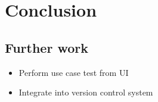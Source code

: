 \chapter{Conclusion}

\section{Further work}
\begin{itemize}
  \item Perform use case test from UI
  \item Integrate into version control system
\end{itemize}


